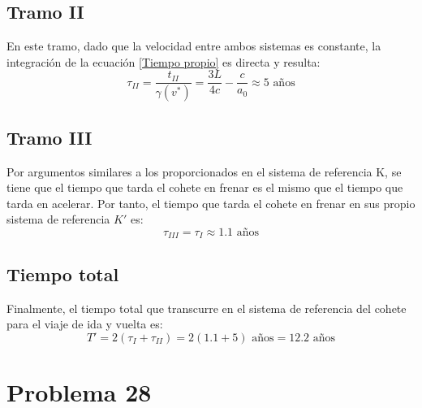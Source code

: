 \documentclass[11pt]{article}
\begin{document}
\subsection*{Tramo II}
En este tramo, dado que la velocidad entre ambos sistemas es constante, la integración de la ecuación \eqref{Tiempo propio} es directa y resulta: 
\begin{equation}
    \tau_{II} = \dfrac{t_{II}}{\gamma(v^*)}=\dfrac{3L}{4c} - \dfrac{c}{a_0} \approx 5 \textrm{ años}
\end{equation}
\subsection*{Tramo III}
Por argumentos similares a los proporcionados en el sistema de referencia K, se tiene que el tiempo que tarda el cohete en frenar es el mismo que el tiempo que tarda en acelerar. Por tanto, el tiempo que tarda el cohete en frenar en sus propio sistema de referencia $K'$ es:
\begin{equation}
    \tau_{III} = \tau_I \approx 1.1 \textrm{ años}
\end{equation}
\subsection*{Tiempo total}
Finalmente, el tiempo total que transcurre en el sistema de referencia del cohete para el viaje de ida y vuelta es:
\begin{equation}
    T' = 2(\tau_I + \tau_{II}) = 2(1.1 + 5) \textrm{ años} = 12.2 \textrm{ años} 
\end{equation}
\section*{Problema 28}
\end{document}
